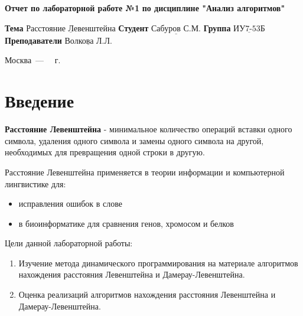 \documentclass[12pt]{report}
\begin{document}
\begin{titlepage}
	
	\begin{center}
		\noindent\begin{minipage}{1.3\textwidth}\centering
			\Large\textbf{  Отчет по лабораторной работе №1}\newline
			\textbf{по дисциплине "Анализ алгоритмов"}\newline\newline
		\end{minipage}
	\end{center}
	
	\noindent\textbf{Тема} $\underline{\text{Расстояние Левенштейна}}$\newline\newline
	\noindent\textbf{Студент} $\underline{\text{Сабуров С.М.}}$\newline\newline
	\noindent\textbf{Группа} $\underline{\text{ИУ7-53Б}}$\newline\newline
	\noindent\textbf{Преподаватели} $\underline{\text{Волкова Л.Л.}}$\newline\newline\newline
	
	\begin{center}
		\vfill
		Москва~---~\the\year
		~г.
	\end{center}
\end{titlepage}


\tableofcontents

\newpage
\chapter*{Введение}
\textbf{Расстояние Левенштейна} - минимальное количество операций вставки одного символа, удаления одного символа и замены одного символа на другой, необходимых для превращения одной строки в другую.
\newline

Расстояние Левенштейна применяется в теории информации и компьютерной лингвистике для:

\begin{itemize}
	\item исправления ошибок в слове
	\item в биоинформатике для сравнения генов, хромосом и белков
\end{itemize}

Цели данной лабораторной работы: 
\begin{enumerate}
	\item Изучение метода динамического программирования на материале алгоритмов нахождения расстояния Левенштейна и Дамерау-Левенштейна.
	\item Оценка реализаций алгоритмов нахождения расстояния Левенштейна и Дамерау-Левенштейна.
\end{enumerate}
\end{document}
